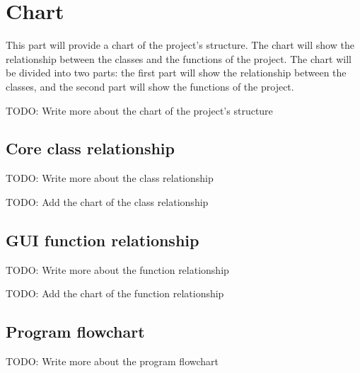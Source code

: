 \section{Chart}
\label{sec:chart}

\hspace{1cm} This part will provide a chart of the project's structure. The chart will show the relationship between the classes and the functions of the project. The chart will be divided into two parts: the first part will show the relationship between the classes, and the second part will show the functions of the project.

\vspace{0.5cm}

\hspace{1cm} TODO: Write more about the chart of the project's structure

\subsection{Core class relationship}

\hspace{1cm} TODO: Write more about the class relationship

\vspace{0.5cm}

\hspace{1cm} TODO: Add the chart of the class relationship

\subsection{GUI function relationship}

\hspace{1cm} TODO: Write more about the function relationship

\vspace{0.5cm}

\hspace{1cm} TODO: Add the chart of the function relationship

\subsection{Program flowchart}

\hspace{1cm} TODO: Write more about the program flowchart

